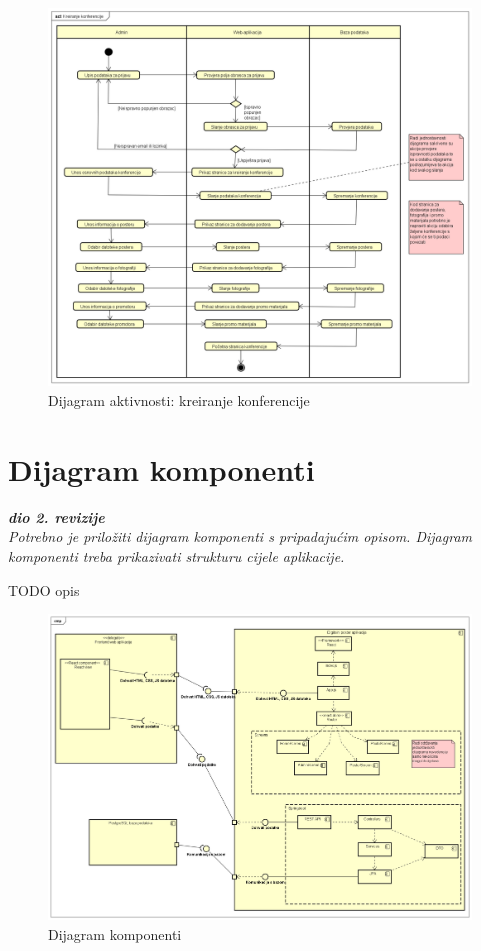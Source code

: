 			\begin{figure}[H]
				\includegraphics[width=\textwidth]{slike/dijagramAktivnosti.PNG} %
				\caption{Dijagram aktivnosti: kreiranje konferencije}
				\label{fig:dijagramAktivnosti} %
			\end{figure}
			
			\eject
		\section{Dijagram komponenti}

			\textbf{\textit{dio 2. revizije}}\\

			 \textit{Potrebno je priložiti dijagram komponenti s pripadajućim opisom. Dijagram komponenti treba prikazivati strukturu cijele aplikacije.}
			 
			 TODO opis
			 
			 \begin{figure}[H]
			 	\includegraphics[width=\textwidth]{slike/dijagramKomponenti.PNG} %
			 	\caption{Dijagram komponenti}
			 	\label{fig:dijagramKomponenti} %
			 \end{figure}
			 